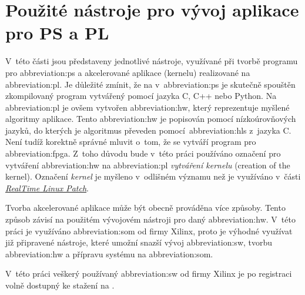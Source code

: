 \documentclass[a4paper, twoside, 11pt]{article}
\begin{document}
\section{Použité nástroje pro vývoj aplikace pro PS a PL}
V~této části jsou představeny jednotlivé nástroje, využívané při tvorbě programu pro \gls{abbreviation:ps} a akcelerované aplikace (kernelu) realizované na \gls{abbreviation:pl}. Je důležité zmínit, že na v~\gls{abbreviation:ps} je skutečně spouštěn zkompilovaný program vytvářený pomocí jazyka C, C++ nebo Python. Na \gls{abbreviation:pl} je ovšem vytvořen \gls{abbreviation:hw}, který reprezentuje myšlené algoritmy aplikace. Tento \gls{abbreviation:hw} je popisován pomocí nízkoúrovňových jazyků, do kterých je algoritmus převeden pomocí~\gls{abbreviation:hls} z~jazyka C. Není tudíž korektně správné mluvit o~tom, že se vytváří program pro \gls{abbreviation:fpga}. Z~toho důvodu bude v~této práci používáno označení pro vytváření \gls{abbreviation:hw} na \gls{abbreviation:pl} \textit{vytváření kernelu} (creation of the kernel). Označení \textit{kernel} je myšleno v~odlišném významu než je využíváno v~části \hyperref[subsec:real-time-linux-patch]{\textit{RealTime Linux Patch}}.\par
Tvorba akcelerované aplikace může být obecně prováděna více způsoby. Tento způsob závisí na použitém vývojovém nástroji pro daný \gls{abbreviation:hw}. V~této práci je využíváno \gls{abbreviation:som} od firmy Xilinx, proto je výhodné využívat již připravené nástroje, které umožní snazší vývoj \gls{abbreviation:sw}, tvorbu \gls{abbreviation:hw} a přípravu systému na \gls{abbreviation:som}.\par
	V~této práci veškerý používaný \gls{abbreviation:sw} od firmy Xilinx je po registraci volně dostupný ke stažení na \cite{xilinx-downloads}.
\end{document}
